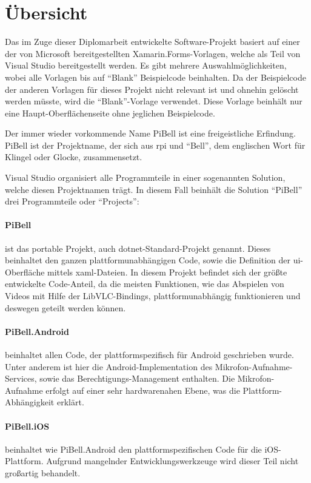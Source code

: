 \label{ch:prog-doc}
\section{Übersicht}
Das im Zuge dieser Diplomarbeit entwickelte Software-Projekt basiert auf einer der von Microsoft bereitgestellten Xamarin.Forms-Vorlagen, welche als Teil von Visual Studio bereitgestellt werden.
Es gibt mehrere Auswahlmöglichkeiten, wobei alle Vorlagen bis auf \enquote{Blank} Beispielcode beinhalten.
Da der Beispielcode der anderen Vorlagen für dieses Projekt nicht relevant ist und ohnehin gelöscht werden müsste, wird die \enquote{Blank}-Vorlage verwendet.
Diese Vorlage beinhält nur eine Haupt-Oberflächenseite ohne jeglichen Beispielcode.

Der immer wieder vorkommende Name PiBell ist eine freigeistliche Erfindung. PiBell ist der Projektname, der sich aus \acl{rpi} und \enquote{Bell}, dem englischen Wort für Klingel oder Glocke, zusammensetzt.

Visual Studio organisiert alle Programmteile in einer sogenannten Solution, welche diesen Projektnamen trägt. In diesem Fall beinhält die Solution \enquote{PiBell} drei Programmteile oder \enquote{Projects}:
\paragraph{PiBell} ist das portable Projekt, auch \ac{dotnet}-Standard-Projekt genannt.
Dieses beinhaltet den ganzen plattformunabhängigen Code, sowie die Definition der \ac{ui}-Oberfläche mittels \ac{xaml}-Dateien.
In diesem Projekt befindet sich der größte entwickelte Code-Anteil, da die meisten Funktionen, wie das Abspielen von Videos mit Hilfe der LibVLC-Bindings, plattformunabhängig funktionieren und deswegen geteilt werden können.

\paragraph{PiBell.Android} beinhaltet allen Code, der plattformspezifisch für Android geschrieben wurde.
Unter anderem ist hier die Android-Implementation des Mikrofon-Auf\-nahme-Services, sowie das Berechtigungs-Management enthalten.
Die Mikrofon-Aufnahme erfolgt auf einer sehr hardwarenahen Ebene, was die Plattform-Abhängigkeit erklärt.

\paragraph{PiBell.iOS} beinhaltet wie PiBell.Android den plattformspezifischen Code für die iOS-Platt\-form. Aufgrund mangelnder Entwicklungswerkzeuge wird dieser Teil nicht großartig behandelt.\par

